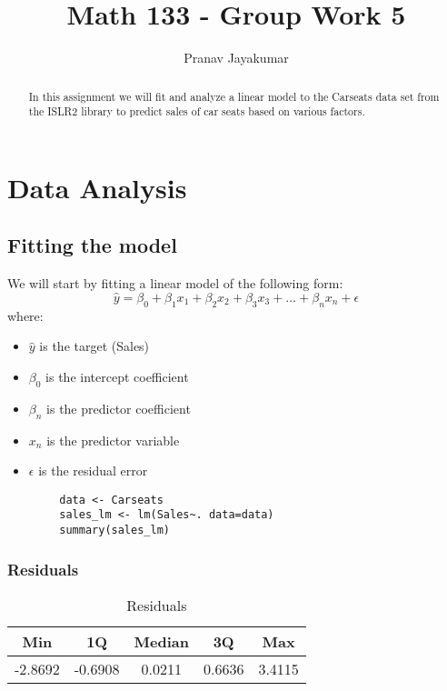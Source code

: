 \documentclass{article}
\title{Math 133 - Group Work 5}
\author{Pranav Jayakumar}
\theoremstyle{mytheoremstyle}
\theoremstyle{mytheoremstyle}
\theoremstyle{myproblemstyle}
\begin{document}
    \maketitle
    \begin{abstract}
      In this assignment we will fit and analyze a linear model to the Carseats data set from the ISLR2 library to predict sales of car seats based on 
      various factors. 
    \end{abstract}

    \section{Data Analysis}
    \vspace{0.25in}
      \subsection{Fitting the model}
        We will start by fitting a linear model of the following form:
        \[
          \hat{y} = \beta_0 + \beta_1 x_1 + \beta_2 x_2 + \beta_3 x_3 + \dots + \beta_n x_n + \epsilon
      \]
      where:
      \begin{itemize}
        \item \(\hat{y}\) is the target (Sales)
        \item \(\beta_0\) is the intercept coefficient
        \item \(\beta_n\) is the predictor coefficient
        \item \(x_n\) is the predictor variable
        \item \(\epsilon\) is the residual error
      \end{itemize}
      \vspace{0.1in}
      \begin{lstlisting}
        data <- Carseats
        sales_lm <- lm(Sales~. data=data)
        summary(sales_lm)
      \end{lstlisting}
      \vspace{0.25in}
      \subsubsection{Residuals}
      \begin{table}[H]
        \centering
        \begin{tabular}{ccccc}
        \hline
        Min & 1Q & Median & 3Q & Max \\ 
        \hline
        -2.8692 & -0.6908 & 0.0211 & 0.6636 & 3.4115 \\ 
        \hline
        \end{tabular}
        \caption{Residuals}
        \label{tab:residuals}
      \end{table}
\end{document}

